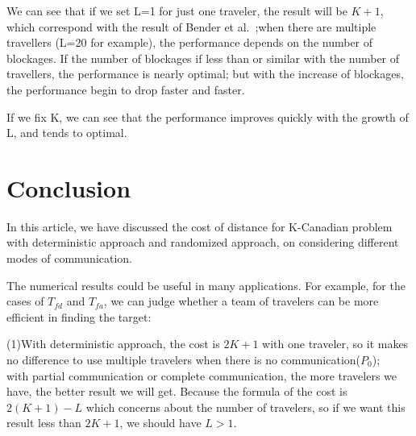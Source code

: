 \documentclass[letter-size, 11pt]{article}
\begin{document}
We can see that if we set L=1 for just one traveler, the result will be $K+1$, which correspond with the result of Bender et al.~\cite{BeWe15};when there are multiple travellers (L=20 for example), the performance depends on the number of blockages. If the number of blockages if less than or similar with the number of travellers, the performance is nearly optimal; but with the increase of blockages, the performance begin to drop faster and faster.

If we fix K, we can see that the performance improves quickly with the growth of L, and tends to optimal.

%


\section{Conclusion}
In this article, we have discussed the cost of distance for K-Canadian problem with deterministic approach and randomized approach, on considering different modes of communication. 

The numerical results could be useful in many applications. For example, for the cases of $T_{fd}$ and $T_{fa}$, we can judge whether a team of travelers can be more efficient in finding the target:

(1)With deterministic approach, the cost is $2K+1$ with one traveler, so it makes no difference to use multiple travelers when there is no communication($P_0$); 
\\with partial communication or complete communication, the more travelers we have, the better result we will get. Because the formula of the cost is $2(K+1)-L$ which concerns about the number of travelers, so if we want this result less than $2K+1$, we should have $L>1$.
\end{document}
